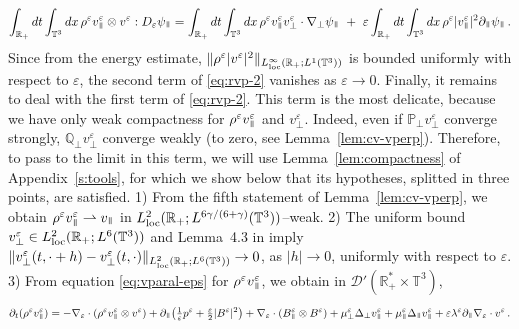 \documentclass[11pt,reqno]{amsart}
\def \R{{\mathbb{R}}}
\def \Q{{\mathbb{Q}}}
\def \T{{\mathbb{T}}}
\def \P{{\mathbb{P}}}
\newcommand{\myparallel}{{\mkern3mu\vphantom{\perp}\vrule depth 0pt\mkern2mu\vrule depth 0pt\mkern3mu}}
\begin{document}
\begin{equation}
  \label{eq:rvp-2}
    \int_{\R_+}  dt \int_{\T^3}dx \, \rho^\varepsilon v_\myparallel^\varepsilon \otimes v^\varepsilon : D_\varepsilon\psi_\myparallel
  = \int_{\R_+}  dt \int_{\T^3}dx \, \rho^\varepsilon v_\myparallel^\varepsilon  v_\perp^\varepsilon \cdot \nabla_\perp\psi_\myparallel 
  \ +  \ \varepsilon\int_{\R_+}  dt \int_{\T^3}dx \, \rho^\varepsilon |v_\myparallel^\varepsilon|^2 \partial_\myparallel\psi_\myparallel\,. 
\end{equation}  
Since from the energy estimate, $\|\rho^\varepsilon |v^\varepsilon|^2 \|_{L_{\rm loc}^\infty(\R_+;L^1(\T^3))}$ is bounded uniformly with respect to $\varepsilon$, the second term of \eqref{eq:rvp-2} vanishes as $\varepsilon \rightarrow 0$. Finally, it  remains to deal with the first term of \eqref{eq:rvp-2}. This term is the most delicate, because we have only weak compactness for $\rho^\varepsilon v_\myparallel^\varepsilon$  and $v_\perp^\varepsilon$. Indeed, even if $\P_\perp v_\perp^\varepsilon$ converge strongly,  $\Q_\perp v_\perp^\varepsilon$ converge weakly (to zero, see Lemma~\ref{lem:cv-vperp}). Therefore, to pass to the limit in this term, we will use  Lemma~\ref{lem:compactness} of Appendix~\ref{s:tools}, for which we show below that its hypotheses, splitted in three points, are satisfied. 1) From the fifth statement of Lemma~\ref{lem:cv-vperp}, we obtain $ \rho^\varepsilon v_\myparallel^\varepsilon \rightharpoonup  v_\myparallel $ in $L_{\rm loc}^2(\R_+; L^{6\gamma/(6+\gamma)}(\T^3))$--weak. 2) The uniform bound $v_\perp^\varepsilon \in  L_{\rm loc}^2(\R_+; L^6(\T^3))$ and Lemma~4.3 in \cite{Bre11} imply $\|v_\perp^\varepsilon (t,\cdot +h )- v_\perp^\varepsilon (t,\cdot )\|_{L_{\rm loc}^2(\R_+; L^6(\T^3))} \rightarrow 0$, as $|h|\rightarrow 0$, uniformly with respect to $\varepsilon$. 3) From equation \eqref{eq:vparal-eps} for $\rho^\varepsilon v_\myparallel^\varepsilon$, we obtain in $\mathcal D'(\R_+^*\times \T^3)$,
\begin{equation}
  \label{eqn:ptvpa}
  \partial_t(\rho^\varepsilon v_\myparallel^\varepsilon)
  =-\nabla_\varepsilon \cdot (\rho^\varepsilon v_\myparallel^\varepsilon \otimes  v^\varepsilon )
  + \partial_\myparallel \big(\tfrac 1 \varepsilon p^\varepsilon + \tfrac{\varepsilon}2 |B^\varepsilon|^2\big)+
  \nabla_\varepsilon \cdot(B_\myparallel^\varepsilon \otimes  B^\varepsilon )
  + \mu_\perp^\varepsilon \Delta_\perp  v_\myparallel^\varepsilon + \mu_\myparallel^\varepsilon \Delta_\myparallel v_\myparallel^\varepsilon
  +\varepsilon \lambda^\varepsilon \partial_\myparallel\nabla_\varepsilon \cdot v^\varepsilon
  \,.
\end{equation}
\end{document}
